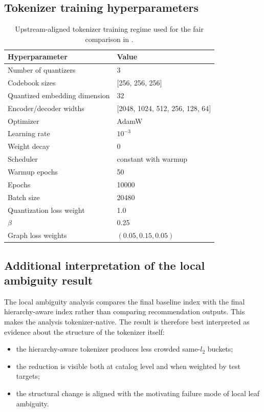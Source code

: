 \subsection{Tokenizer training hyperparameters}

\begin{table}[h]
  \centering
  \caption{Upstream-aligned tokenizer training regime used for the fair comparison in .}
  \label{tab:appendix-train}
  \begin{tabular}{ll}
    \toprule
    Hyperparameter & Value \\
    \midrule
    Number of quantizers & 3 \\
    Codebook sizes & [256, 256, 256] \\
    Quantized embedding dimension & 32 \\
    Encoder/decoder widths & [2048, 1024, 512, 256, 128, 64] \\
    Optimizer & AdamW \\
    Learning rate & $10^{-3}$ \\
    Weight decay & 0 \\
    Scheduler & constant with warmup \\
    Warmup epochs & 50 \\
    Epochs & 10000 \\
    Batch size & 20480 \\
    Quantization loss weight & 1.0 \\
    $\beta$ & 0.25 \\
    Graph loss weights & $(0.05, 0.15, 0.05)$ \\
    \bottomrule
  \end{tabular}
\end{table}

\subsection{Additional interpretation of the local ambiguity result}

The local ambiguity analysis compares the final baseline index with the final hierarchy-aware index rather than comparing recommendation outputs. This makes the analysis tokenizer-native. The result is therefore best interpreted as evidence about the structure of the tokenizer itself:
\begin{itemize}[leftmargin=1.4em]
  \item the hierarchy-aware tokenizer produces less crowded same-$l_2$ buckets;
  \item the reduction is visible both at catalog level and when weighted by test targets;
  \item the structural change is aligned with the motivating failure mode of local leaf ambiguity.
\end{itemize}

